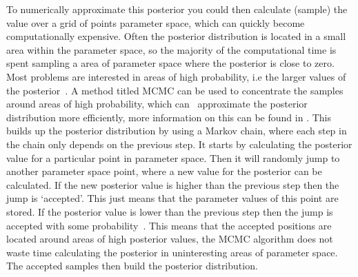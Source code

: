 To numerically approximate this posterior you could then calculate (sample) the
value over a grid of points parameter space, which can quickly become
computationally expensive. Often the posterior distribution is located in a
small area within the parameter space, so the majority of the computational
time is spent sampling a area of parameter space where the posterior is close
to zero.  Most problems are interested in areas of high probability, i.e the
larger values of the posterior~.  A method titled \gls{MCMC}
can be used to concentrate the samples around areas of high probability, which
can~ approximate the posterior distribution more
efficiently, more information on this can be found in
\citep{metropolis1953EquationState,vanravenzwaaij2018SimpleIntroduction,sharma2017MarkovChain}.
This builds up the posterior distribution by using a Markov chain, where each
step in the chain only depends on the previous step.  It starts by calculating
the posterior value for a particular point in parameter space. Then it will
randomly jump to another parameter space point, where a new value for the
posterior can be calculated.  If the new posterior value is higher than the
previous step then the jump is `accepted'. This just means that the parameter
values of this point are stored.  If the posterior value is lower than the
previous step then the jump is accepted with some probability~.
This means that the accepted positions are located around areas of high
posterior values, the \gls{MCMC} algorithm does not waste time calculating the
posterior in uninteresting areas of parameter space.  The accepted samples then
build the posterior distribution.~ 

